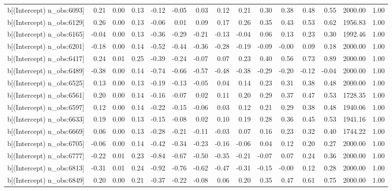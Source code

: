 \begin{table}[ht]
\begin{tabular}{rrrrrrrrrrrrrrr}
  b[(Intercept) n\_obs:6093] & 0.21 & 0.00 & 0.13 & -0.12 & -0.05 & 0.03 & 0.12 & 0.21 & 0.30 & 0.38 & 0.48 & 0.55 & 2000.00 & 1.00 \\ 
  b[(Intercept) n\_obs:6129] & 0.26 & 0.00 & 0.13 & -0.06 & 0.01 & 0.09 & 0.17 & 0.26 & 0.35 & 0.43 & 0.53 & 0.62 & 1956.83 & 1.00 \\ 
  b[(Intercept) n\_obs:6165] & -0.04 & 0.00 & 0.13 & -0.36 & -0.29 & -0.21 & -0.13 & -0.04 & 0.06 & 0.13 & 0.23 & 0.30 & 1992.46 & 1.00 \\ 
  b[(Intercept) n\_obs:6201] & -0.18 & 0.00 & 0.14 & -0.52 & -0.44 & -0.36 & -0.28 & -0.19 & -0.09 & -0.00 & 0.09 & 0.18 & 2000.00 & 1.00 \\ 
  b[(Intercept) n\_obs:6417] & 0.24 & 0.01 & 0.25 & -0.39 & -0.24 & -0.07 & 0.07 & 0.23 & 0.40 & 0.56 & 0.73 & 0.89 & 2000.00 & 1.00 \\ 
  b[(Intercept) n\_obs:6489] & -0.38 & 0.00 & 0.14 & -0.74 & -0.66 & -0.57 & -0.48 & -0.38 & -0.29 & -0.20 & -0.12 & -0.04 & 2000.00 & 1.00 \\ 
  b[(Intercept) n\_obs:6525] & 0.13 & 0.00 & 0.13 & -0.19 & -0.13 & -0.05 & 0.04 & 0.14 & 0.23 & 0.31 & 0.38 & 0.48 & 2000.00 & 1.00 \\ 
  b[(Intercept) n\_obs:6561] & 0.20 & 0.00 & 0.14 & -0.16 & -0.07 & 0.02 & 0.11 & 0.20 & 0.29 & 0.37 & 0.47 & 0.53 & 1728.35 & 1.00 \\ 
  b[(Intercept) n\_obs:6597] & 0.12 & 0.00 & 0.14 & -0.22 & -0.15 & -0.06 & 0.03 & 0.12 & 0.21 & 0.29 & 0.38 & 0.48 & 1940.06 & 1.00 \\ 
  b[(Intercept) n\_obs:6633] & 0.19 & 0.00 & 0.13 & -0.15 & -0.08 & 0.02 & 0.10 & 0.19 & 0.28 & 0.36 & 0.45 & 0.53 & 1941.16 & 1.00 \\ 
  b[(Intercept) n\_obs:6669] & 0.06 & 0.00 & 0.13 & -0.28 & -0.21 & -0.11 & -0.03 & 0.07 & 0.16 & 0.23 & 0.32 & 0.40 & 1744.22 & 1.00 \\ 
  b[(Intercept) n\_obs:6705] & -0.06 & 0.00 & 0.14 & -0.42 & -0.34 & -0.23 & -0.16 & -0.06 & 0.04 & 0.12 & 0.20 & 0.27 & 2000.00 & 1.00 \\ 
  b[(Intercept) n\_obs:6777] & -0.22 & 0.01 & 0.23 & -0.84 & -0.67 & -0.50 & -0.35 & -0.21 & -0.07 & 0.07 & 0.24 & 0.36 & 2000.00 & 1.00 \\ 
  b[(Intercept) n\_obs:6813] & -0.31 & 0.01 & 0.24 & -0.92 & -0.76 & -0.62 & -0.47 & -0.31 & -0.15 & -0.00 & 0.12 & 0.28 & 2000.00 & 1.00 \\ 
  b[(Intercept) n\_obs:6849] & 0.20 & 0.00 & 0.21 & -0.37 & -0.22 & -0.08 & 0.06 & 0.20 & 0.35 & 0.47 & 0.61 & 0.75 & 2000.00 & 1.00 \\ 

\end{tabular}
\end{table}
